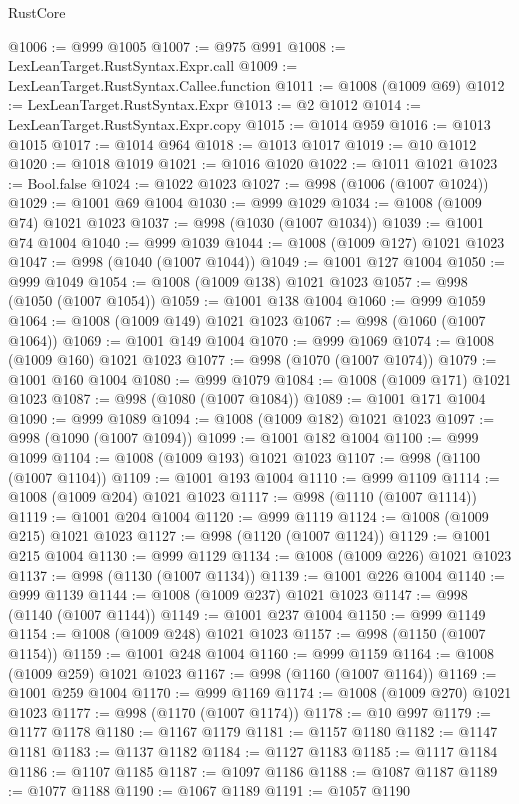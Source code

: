 \begin{lexlean}{RustCore}
\begin{coremodule}
@1006 := @999 @1005
@1007 := @975 @991
@1008 := LexLeanTarget.RustSyntax.Expr.call
@1009 := LexLeanTarget.RustSyntax.Callee.function
@1011 := @1008 (@1009 @69)
@1012 := LexLeanTarget.RustSyntax.Expr
@1013 := @2 @1012
@1014 := LexLeanTarget.RustSyntax.Expr.copy
@1015 := @1014 @959
@1016 := @1013 @1015
@1017 := @1014 @964
@1018 := @1013 @1017
@1019 := @10 @1012
@1020 := @1018 @1019
@1021 := @1016 @1020
@1022 := @1011 @1021
@1023 := Bool.false
@1024 := @1022 @1023
@1027 := @998 (@1006 (@1007 @1024))
@1029 := @1001 @69 @1004
@1030 := @999 @1029
@1034 := @1008 (@1009 @74) @1021 @1023
@1037 := @998 (@1030 (@1007 @1034))
@1039 := @1001 @74 @1004
@1040 := @999 @1039
@1044 := @1008 (@1009 @127) @1021 @1023
@1047 := @998 (@1040 (@1007 @1044))
@1049 := @1001 @127 @1004
@1050 := @999 @1049
@1054 := @1008 (@1009 @138) @1021 @1023
@1057 := @998 (@1050 (@1007 @1054))
@1059 := @1001 @138 @1004
@1060 := @999 @1059
@1064 := @1008 (@1009 @149) @1021 @1023
@1067 := @998 (@1060 (@1007 @1064))
@1069 := @1001 @149 @1004
@1070 := @999 @1069
@1074 := @1008 (@1009 @160) @1021 @1023
@1077 := @998 (@1070 (@1007 @1074))
@1079 := @1001 @160 @1004
@1080 := @999 @1079
@1084 := @1008 (@1009 @171) @1021 @1023
@1087 := @998 (@1080 (@1007 @1084))
@1089 := @1001 @171 @1004
@1090 := @999 @1089
@1094 := @1008 (@1009 @182) @1021 @1023
@1097 := @998 (@1090 (@1007 @1094))
@1099 := @1001 @182 @1004
@1100 := @999 @1099
@1104 := @1008 (@1009 @193) @1021 @1023
@1107 := @998 (@1100 (@1007 @1104))
@1109 := @1001 @193 @1004
@1110 := @999 @1109
@1114 := @1008 (@1009 @204) @1021 @1023
@1117 := @998 (@1110 (@1007 @1114))
@1119 := @1001 @204 @1004
@1120 := @999 @1119
@1124 := @1008 (@1009 @215) @1021 @1023
@1127 := @998 (@1120 (@1007 @1124))
@1129 := @1001 @215 @1004
@1130 := @999 @1129
@1134 := @1008 (@1009 @226) @1021 @1023
@1137 := @998 (@1130 (@1007 @1134))
@1139 := @1001 @226 @1004
@1140 := @999 @1139
@1144 := @1008 (@1009 @237) @1021 @1023
@1147 := @998 (@1140 (@1007 @1144))
@1149 := @1001 @237 @1004
@1150 := @999 @1149
@1154 := @1008 (@1009 @248) @1021 @1023
@1157 := @998 (@1150 (@1007 @1154))
@1159 := @1001 @248 @1004
@1160 := @999 @1159
@1164 := @1008 (@1009 @259) @1021 @1023
@1167 := @998 (@1160 (@1007 @1164))
@1169 := @1001 @259 @1004
@1170 := @999 @1169
@1174 := @1008 (@1009 @270) @1021 @1023
@1177 := @998 (@1170 (@1007 @1174))
@1178 := @10 @997
@1179 := @1177 @1178
@1180 := @1167 @1179
@1181 := @1157 @1180
@1182 := @1147 @1181
@1183 := @1137 @1182
@1184 := @1127 @1183
@1185 := @1117 @1184
@1186 := @1107 @1185
@1187 := @1097 @1186
@1188 := @1087 @1187
@1189 := @1077 @1188
@1190 := @1067 @1189
@1191 := @1057 @1190

\end{coremodule}
\end{lexlean}
